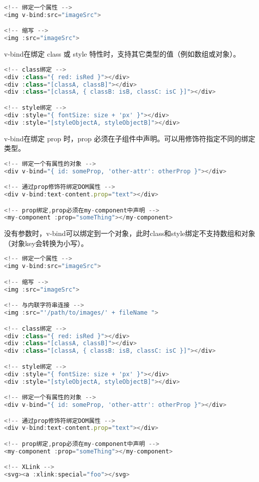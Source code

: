 \begin{lstlisting}[language=JavaScript]
<!-- 绑定一个属性 -->
<img v-bind:src="imageSrc">

<!-- 缩写 -->
<img :src="imageSrc">
\end{lstlisting}


\begin{compactitem}
\item v-bind在绑定 class 或 style 特性时，支持其它类型的值（例如数组或对象）。


\begin{lstlisting}[language=JavaScript]
<!-- class绑定 -->
<div :class="{ red: isRed }"></div>
<div :class="[classA, classB]"></div>
<div :class="[classA, { classB: isB, classC: isC }]"></div>

<!-- style绑定 -->
<div :style="{ fontSize: size + 'px' }"></div>
<div :style="[styleObjectA, styleObjectB]"></div>
\end{lstlisting}

\item v-bind在绑定 prop 时，prop 必须在子组件中声明。可以用修饰符指定不同的绑定类型。

\begin{lstlisting}[language=JavaScript]
<!-- 绑定一个有属性的对象 -->
<div v-bind="{ id: someProp, 'other-attr': otherProp }"></div>

<!-- 通过prop修饰符绑定DOM属性 -->
<div v-bind:text-content.prop="text"></div>

<!-- prop绑定,prop必须在my-component中声明 -->
<my-component :prop="someThing"></my-component>
\end{lstlisting}

\end{compactitem}

没有参数时，v-bind可以绑定到一个对象，此时class和style绑定不支持数组和对象（对象key会转换为小写）。

\begin{lstlisting}[language=JavaScript]
<!-- 绑定一个属性 -->
<img v-bind:src="imageSrc">

<!-- 缩写 -->
<img :src="imageSrc">

<!-- 与内联字符串连接 -->
<img :src="'/path/to/images/' + fileName ">

<!-- class绑定 -->
<div :class="{ red: isRed }"></div>
<div :class="[classA, classB]"></div>
<div :class="[classA, { classB: isB, classC: isC }]"></div>

<!-- style绑定 -->
<div :style="{ fontSize: size + 'px' }"></div>
<div :style="[styleObjectA, styleObjectB]"></div>

<!-- 绑定一个有属性的对象 -->
<div v-bind="{ id: someProp, 'other-attr': otherProp }"></div>

<!-- 通过prop修饰符绑定DOM属性 -->
<div v-bind:text-content.prop="text"></div>

<!-- prop绑定,prop必须在my-component中声明 -->
<my-component :prop="someThing"></my-component>

<!-- XLink -->
<svg><a :xlink:special="foo"></svg>
\end{lstlisting}

